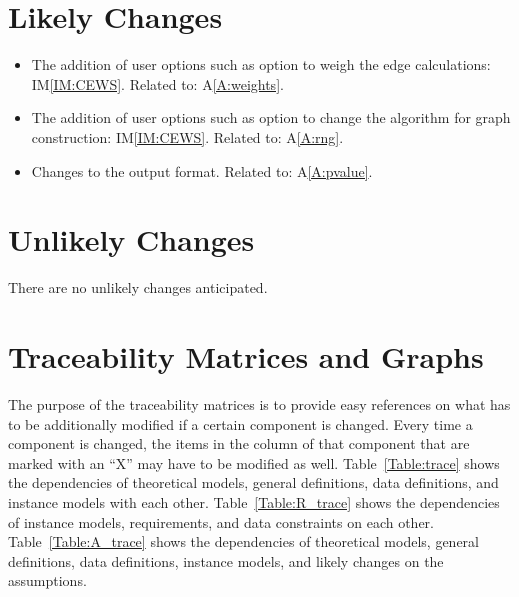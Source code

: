 \documentclass[12pt]{article}
\newcommand{\aref}[1]{A\ref{#1}}
\newcommand{\iref}[1]{IM\ref{#1}}
\newcounter{lcnum} %
\begin{document}
\section{Likely Changes}    

\noindent \begin{itemize}

\item[LC\refstepcounter{lcnum}\thelcnum\label{LC:optWeights}:] The addition of user options such as option to weigh the edge calculations: \iref{IM:CEWS}. Related to: \aref{A:weights}.

\item[LC\refstepcounter{lcnum}\thelcnum\label{LC:optGraphs}:] The addition of user options such as option to change the algorithm for graph construction: \iref{IM:CEWS}. Related to: \aref{A:rng}.

\item[LC\refstepcounter{lcnum}\thelcnum\label{LC:output}:] Changes to the output format. Related to: \aref{A:pvalue}.

\end{itemize}

\section{Unlikely Changes}    

There are no unlikely changes anticipated.





\section{Traceability Matrices and Graphs}

The purpose of the traceability matrices is to provide easy references on what
has to be additionally modified if a certain component is changed.  Every time a
component is changed, the items in the column of that component that are marked
with an ``X'' may have to be modified as well.  Table~\ref{Table:trace} shows the
dependencies of theoretical models, general definitions, data definitions, and
instance models with each other. Table~\ref{Table:R_trace} shows the
dependencies of instance models, requirements, and data constraints on each
other. Table~\ref{Table:A_trace} shows the dependencies of theoretical models,
general definitions, data definitions, instance models, and likely changes on
the assumptions.
\end{document}
